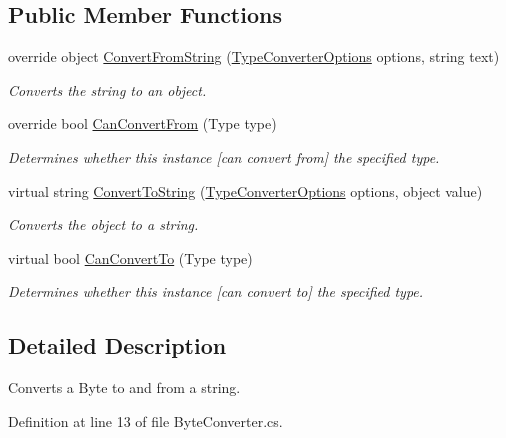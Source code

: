 \subsection*{Public Member Functions}
\begin{DoxyCompactItemize}
\item 
override object \hyperlink{a00040_a6176d20d761abfc0af4e840553ffae47}{Convert\-From\-String} (\hyperlink{a00172}{Type\-Converter\-Options} options, string text)
\begin{DoxyCompactList}\small\item\em Converts the string to an object. \end{DoxyCompactList}\item 
override bool \hyperlink{a00040_a74a66b405f6c18e69b9fd23a1dea91b0}{Can\-Convert\-From} (Type type)
\begin{DoxyCompactList}\small\item\em Determines whether this instance \mbox{[}can convert from\mbox{]} the specified type. \end{DoxyCompactList}\item 
virtual string \hyperlink{a00082_a36cb2f9b24f15a671293f3a722324c27}{Convert\-To\-String} (\hyperlink{a00172}{Type\-Converter\-Options} options, object value)
\begin{DoxyCompactList}\small\item\em Converts the object to a string. \end{DoxyCompactList}\item 
virtual bool \hyperlink{a00082_acb65bd8c8199d88d5b1629ae35d18514}{Can\-Convert\-To} (Type type)
\begin{DoxyCompactList}\small\item\em Determines whether this instance \mbox{[}can convert to\mbox{]} the specified type. \end{DoxyCompactList}\end{DoxyCompactItemize}


\subsection{Detailed Description}
Converts a Byte to and from a string. 



Definition at line 13 of file Byte\-Converter.\-cs.



